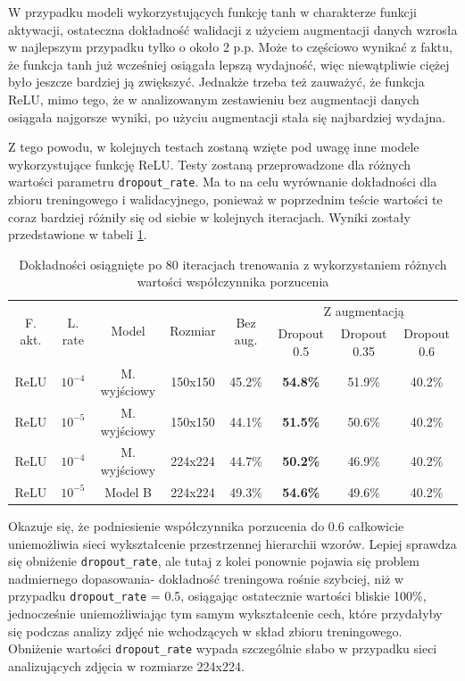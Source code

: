 W przypadku modeli wykorzystujących funkcję tanh w charakterze funkcji aktywacji, ostateczna dokładność walidacji z użyciem augmentacji danych wzrosła w najlepszym przypadku tylko o około 2 p.p. Może to częściowo wynikać z faktu, że funkcja tanh już wcześniej osiągała lepszą wydajność, więc niewątpliwie ciężej było jeszcze bardziej ją zwiększyć. Jednakże trzeba też zauważyć, że funkcja ReLU, mimo tego, że w analizowanym zestawieniu bez augmentacji danych osiągała najgorsze wyniki, po użyciu augmentacji stała się najbardziej wydajna.

Z tego powodu, w kolejnych testach zostaną wzięte pod uwagę inne modele wykorzystujące funkcję ReLU. Testy zostaną przeprowadzone dla różnych wartości parametru \verb|dropout_rate|. Ma to na celu wyrównanie dokładności dla zbioru treningowego i walidacyjnego, ponieważ w poprzednim teście wartości te coraz bardziej różniły się od siebie w kolejnych iteracjach. Wyniki zostały przedstawione w tabeli \ref{tab:5.8}.

\begin{table}[H]
  \centering
  \caption{Dokładności osiągnięte po 80 iteracjach trenowania z wykorzystaniem różnych wartości współczynnika porzucenia}
    \begin{tabular}{ |c|c|c|c|c|c|c|c| }
    \hline
    \multirow{2}{*}{F. akt.} & \multirow{2}{*}{L. rate} & \multirow{2}{*}{Model} & \multirow{2}{*}{Rozmiar} & \multirow{2}{*}{Bez aug.} & \multicolumn{3}{c|}{Z augmentacją} \\
    \cline{6-8}
    &&&&& Dropout 0.5 & Dropout 0.35 & Dropout 0.6 \\
    \hline
    ReLU & $10^{-4}$ & M. wyjściowy & 150x150 & 45.2\% & \textbf{54.8\%} & 51.9\% & 40.2\% \\
    ReLU & $10^{-5}$ & M. wyjściowy & 150x150 & 44.1\% & \textbf{51.5\%} & 50.6\% & 40.2\% \\
    
    ReLU & $10^{-4}$ & M. wyjściowy & 224x224 & 44.7\% & \textbf{50.2\%} & 46.9\% & 40.2\% \\
    ReLU & $10^{-5}$ & Model B & 224x224 & 49.3\% & \textbf{54.6\%} & 49.6\% & 40.2\% \\
    \hline
    \end{tabular}
  \label{tab:5.8}
\end{table}

Okazuje się, że podniesienie współczynnika porzucenia do 0.6 całkowicie uniemożliwia sieci wykształcenie przestrzennej hierarchii wzorów. Lepiej sprawdza się obniżenie \verb|dropout_rate|, ale tutaj z kolei ponownie pojawia się problem nadmiernego dopasowania- dokładność treningowa rośnie szybciej, niż w przypadku \verb|dropout_rate| = 0.5, osiągając ostatecznie wartości bliskie 100\%, jednocześnie uniemożliwiając tym samym wykształcenie cech, które przydałyby się podczas analizy zdjęć nie wchodzących w skład zbioru treningowego. Obniżenie wartości \verb|dropout_rate| wypada szczególnie słabo w przypadku sieci analizujących zdjęcia w rozmiarze 224x224.

